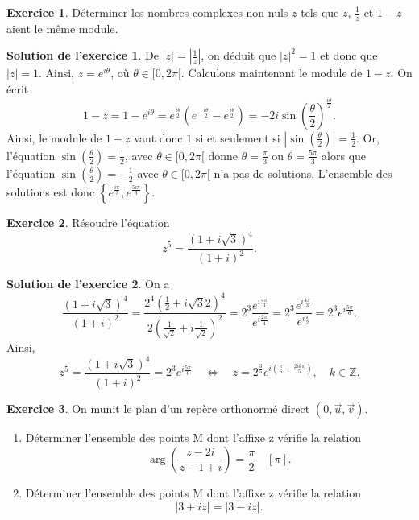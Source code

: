 \documentclass[a4paper, 11pt,openany]{article}%
\theoremstyle{plain}
\theoremstyle{definition}
\newtheorem{exo}{Exercice}
\newtheorem{sol}{Solution de l'exercice}
\theoremstyle{remark}
\newcommand{\Z}{\mathbb{Z}}
\begin{document}
\begin{exo}
Déterminer les nombres complexes non nuls $z$ tels que $z$, $\frac{1}{z}$ et $1-z$ aient le même module.
\end{exo}

\begin{sol}
De $|z|= \left| \frac{1}{z} \right|$, on déduit que $|z|^2=1$ et donc que $|z|=1$. Ainsi, $z=e^{i\theta}$, où $\theta \in [0,2\pi [$. Calculons maintenant le module de $1-z$. On écrit 
\[ 1-z= 1-e^{i\theta} = e^{\frac{i \theta}{2}}(e^{-\frac{i \theta}{2}}- e^{\frac{i \theta}{2}})= -2i\sin \left( \frac{\theta}{2} \right) ^{\frac{i \theta}{2}}.\]
Ainsi, le module de $1-z$ vaut donc $1$ si et seulement si $\left| \sin \left( \frac{\theta}{2} \right) \right|=\frac{1}{2}$. Or, l'équation $\sin \left( \frac{\theta}{2} \right) = \frac{1}{2}$, avec $ \theta \in [0,2 \pi[$ donne $\theta = \frac{\pi}{3}$ ou $\theta = \frac{5 \pi}{3}$ alors que l'équation $\sin \left( \frac{\theta}{2} \right) = -\frac{1}{2}$ avec $\theta \in [0, 2 \pi[$ n'a pas de solutions. L'ensemble des solutions est donc $\left\{ e^{\frac{i \pi}{3}} , e^{\frac{5i \pi}{3}} \right\}$.
\end{sol}

\begin{exo}
Résoudre l'équation
\[ z^5 = \frac{(1+i \sqrt{3})^4}{(1+i)^2}.\]
\end{exo}

\begin{sol}
 On a 
 \[ \frac{(1+i \sqrt{3})^4}{(1+i)^2} = \frac{2^4 \left( \frac{1}{2} + i \sqrt{3}{2} \right)^4}{2 \left( \frac{1}{\sqrt{2}} + i \frac{1}{\sqrt{2}} \right)^2} = 2^3 \frac{e^{i \frac{4\pi}{3}}}{e^{i \frac{2\pi}{4}}}= 2^3 \frac{e^{i \frac{4\pi}{3}}}{e^{i \frac{\pi}{2}}} = 2^3 e^{i \frac{5 \pi}{6}}.\]
  Ainsi,
 \[ z^5 =  \frac{(1+i \sqrt{3})^4}{(1+i)^2} =2^3 e^{i \frac{5 \pi}{6}} \quad \Leftrightarrow \quad  z=2^{\frac{3}{5}} e^{i\left(\frac{\pi}{6} + \frac{2ik \pi}{5} \right)}, \quad  k\in \Z.\]
\end{sol}




\begin{exo}
On munit le plan d'un repère orthonormé direct $(0,\overrightarrow{u},\overrightarrow{v})$.
\begin{enumerate}
\item Déterminer l'ensemble des points M dont l'affixe z vérifie la relation
\[ \arg \left( \frac{z-2i}{z-1+i} \right) = \frac{\pi}{2} \quad [\pi].\]
\item Déterminer l'ensemble des points M dont l'affixe z vérifie la relation
\[ |3 +iz| = |3-iz|.\]
\end{enumerate}
\end{exo}
\end{document}
